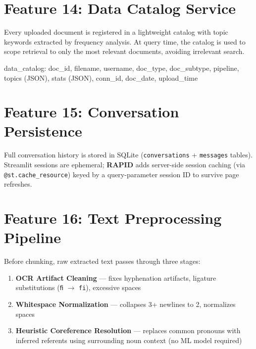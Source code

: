\documentclass[12pt, a4paper, oneside]{report}
\newcommand{\kw}[1]{\texttt{\small #1}}
\newcommand{\rapidsys}{\textbf{\color{rapidblue}RAPID}}
\begin{document}
\section{Feature 14: Data Catalog Service}

Every uploaded document is registered in a lightweight catalog with topic keywords extracted
by frequency analysis. At query time, the catalog is used to scope retrieval to only the
most relevant documents, avoiding irrelevant search.

\begin{codebox}
data_catalog:
  doc_id, filename, username, doc_type, doc_subtype,
  pipeline, topics (JSON), stats (JSON),
  conn_id, doc_date, upload_time
\end{codebox}

\section{Feature 15: Conversation Persistence}

Full conversation history is stored in SQLite (\kw{conversations} + \kw{messages} tables).
Streamlit sessions are ephemeral; \rapidsys{} adds server-side session caching
(via \kw{@st.cache\_resource}) keyed by a query-parameter session ID to survive page refreshes.

\section{Feature 16: Text Preprocessing Pipeline}

Before chunking, raw extracted text passes through three stages:
\begin{enumerate}
  \item \textbf{OCR Artifact Cleaning} — fixes hyphenation artifacts, ligature substitutions (\texttt{ﬁ} $\to$ \texttt{fi}), excessive spaces
  \item \textbf{Whitespace Normalization} — collapses 3+ newlines to 2, normalizes spaces
  \item \textbf{Heuristic Coreference Resolution} — replaces common pronouns with inferred referents using surrounding noun context (no ML model required)
\end{enumerate}

\end{document}
